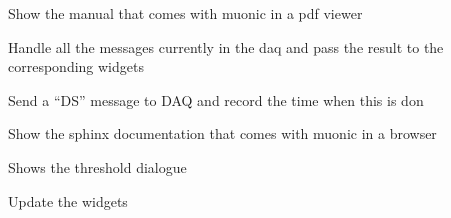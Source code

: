 \documentclass[letterpaper,10pt,english]{sphinxmanual}
\begin{document}
\begin{fulllineitems}
\begin{fulllineitems}
\label{muonic:muonic.gui.MainWindow.MainWindow.manualdoc_menu}
Show the manual that comes with muonic in a pdf viewer

\end{fulllineitems}


\begin{fulllineitems}
\label{muonic:muonic.gui.MainWindow.MainWindow.processIncoming}
Handle all the messages currently in the daq 
and pass the result to the corresponding widgets

\end{fulllineitems}


\begin{fulllineitems}
\label{muonic:muonic.gui.MainWindow.MainWindow.query_daq_for_scalars}
Send a ``DS'' message to DAQ and record the time when this is don

\end{fulllineitems}


\begin{fulllineitems}
\label{muonic:muonic.gui.MainWindow.MainWindow.sphinxdoc_menu}
Show the sphinx documentation that comes with muonic in a
browser

\end{fulllineitems}


\begin{fulllineitems}
\label{muonic:muonic.gui.MainWindow.MainWindow.threshold_menu}
Shows the threshold dialogue

\end{fulllineitems}


\begin{fulllineitems}
\label{muonic:muonic.gui.MainWindow.MainWindow.widgetUpdate}
Update the widgets

\end{fulllineitems}


\end{fulllineitems}
\end{document}
